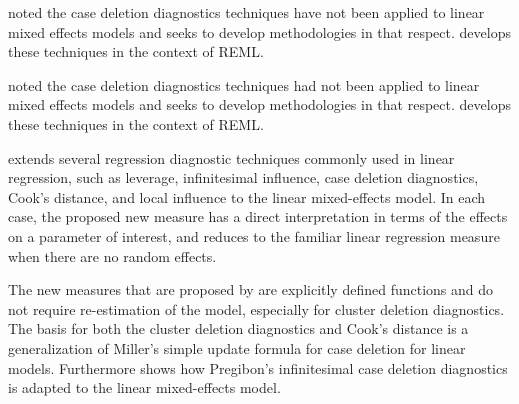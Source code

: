\documentclass[12pt, a4paper]{report}
\theoremstyle{plain}
\theoremstyle{definition}
\theoremstyle{remark}
\begin{document}
	\citet{Christensen} noted the case deletion diagnostics techniques have not been applied to linear mixed effects models and seeks to develop methodologies in that respect. \citet{Christensen} develops these techniques in the context of REML.

	\citet{Christensen} noted the case deletion diagnostics techniques had not been applied to linear mixed effects models and seeks to develop methodologies in that respect. \citet{Christensen} develops these techniques in the context of REML.
	
	
	
	
	\citet{Demi} extends several regression diagnostic techniques commonly used in linear regression, such as leverage, infinitesimal influence, case deletion diagnostics, Cook's distance, and local influence to the linear mixed-effects model. In each case, the proposed new measure has a direct interpretation in terms of the effects on a parameter of interest, and reduces to the familiar linear regression measure when there are no random effects. 
	
	The new measures that are proposed by \citet{Demi} are explicitly defined functions and do not require re-estimation of the model, especially for cluster deletion diagnostics. The basis for both the cluster deletion diagnostics and Cook's distance is a generalization of Miller's simple update formula for case deletion for linear models. Furthermore \citet{Demi} shows how Pregibon's infinitesimal case deletion diagnostics is adapted to the linear mixed-effects model. 
	
	
	
\end{document}
